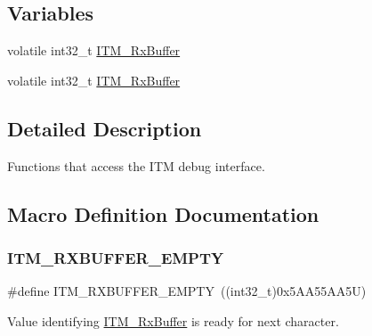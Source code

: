 \subsection*{Variables}
\begin{DoxyCompactItemize}
\item 
volatile int32\+\_\+t \mbox{\hyperlink{group___c_m_s_i_s__core___debug_functions_ga12e68e55a7badc271b948d6c7230b2a8}{I\+T\+M\+\_\+\+Rx\+Buffer}}
\item 
volatile int32\+\_\+t \mbox{\hyperlink{group___c_m_s_i_s__core___debug_functions_ga12e68e55a7badc271b948d6c7230b2a8}{I\+T\+M\+\_\+\+Rx\+Buffer}}
\end{DoxyCompactItemize}


\subsection{Detailed Description}
Functions that access the I\+TM debug interface. 



\subsection{Macro Definition Documentation}
\mbox{\label{group___c_m_s_i_s__core___debug_functions_gaa822cb398ee022b59e9e6c5d7bbb228a}} 
\subsubsection{\texorpdfstring{ITM\_RXBUFFER\_EMPTY}{ITM\_RXBUFFER\_EMPTY}\hspace{0.1cm}{\footnotesize\ttfamily [1/2]}}
{\footnotesize\ttfamily \#define I\+T\+M\+\_\+\+R\+X\+B\+U\+F\+F\+E\+R\+\_\+\+E\+M\+P\+TY~((int32\+\_\+t)0x5\+A\+A55\+A\+A5\+U)}

Value identifying \mbox{\hyperlink{group___c_m_s_i_s__core___debug_functions_ga12e68e55a7badc271b948d6c7230b2a8}{I\+T\+M\+\_\+\+Rx\+Buffer}} is ready for next character. \mbox{\label{group___c_m_s_i_s__core___debug_functions_gaa822cb398ee022b59e9e6c5d7bbb228a}} 
